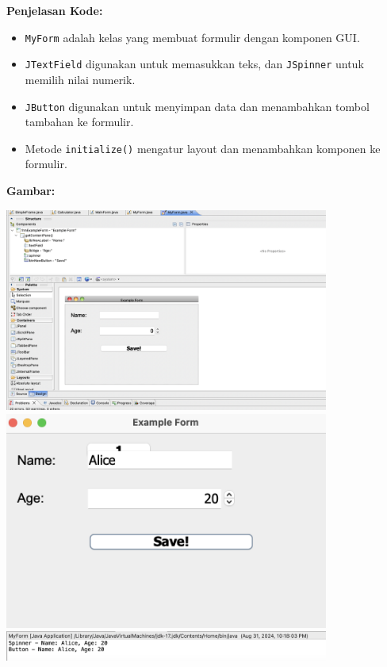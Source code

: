 \textbf{Penjelasan Kode:}
\begin{itemize}
	\item \texttt{MyForm} adalah kelas yang membuat formulir dengan komponen GUI.
	\item \texttt{JTextField} digunakan untuk memasukkan teks, dan \texttt{JSpinner} untuk memilih nilai numerik.
	\item \texttt{JButton} digunakan untuk menyimpan data dan menambahkan tombol tambahan ke formulir.
	\item Metode \texttt{initialize()} mengatur layout dan menambahkan komponen ke formulir.
\end{itemize}

\textbf{Gambar:} \\
\begin{center}
	\includegraphics[width=0.8\textwidth]{assets/pertemuan11/myform_window_builder.png}
	\includegraphics[width=0.8\textwidth]{assets/pertemuan11/myform.png}
	\includegraphics[width=0.8\textwidth]{assets/pertemuan11/myform_result.png}
\end{center}

